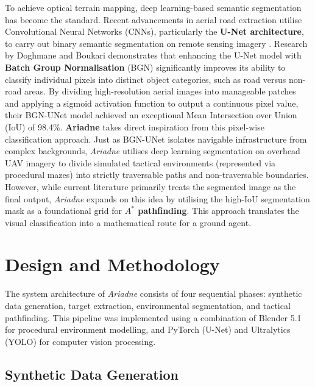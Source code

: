\documentclass[12pt, a4paper]{article}
\begin{document}
\vspace{0.5cm}

To achieve optical terrain mapping, deep learning-based semantic segmentation has become the standard. Recent advancements in aerial road extraction utilise Convolutional Neural Networks (CNNs), particularly the \textbf{U-Net architecture}, to carry out binary semantic segmentation on remote sensing imagery \cite{Doghmane_Boukari_2024}. Research by Doghmane and Boukari demonstrates that enhancing the U-Net model with \textbf{Batch Group Normalisation} (BGN) significantly improves its ability to classify individual pixels into distinct object categories, such as road versus non-road areas. By dividing high-resolution aerial images into manageable patches and applying a sigmoid activation function to output a continuous pixel value, their BGN-UNet model achieved an exceptional Mean Intersection over Union (IoU) of 98.4\%. \textbf{Ariadne} takes direct inspiration from this pixel-wise classification approach. Just as BGN-UNet isolates navigable infrastructure from complex backgrounds, \textit{Ariadne} utilises deep learning segmentation on overhead UAV imagery to divide simulated tactical environments (represented via procedural mazes) into strictly traversable paths and non-traversable boundaries. However, while current literature primarily treats the segmented image as the final output, \textit{Ariadne} expands on this idea by utilising the high-IoU segmentation mask as a foundational grid for \textbf{$A^*$ pathfinding}. This approach translates the visual classification into a mathematical route for a ground agent.

\newpage

\section{Design and Methodology}

The system architecture of \textit{Ariadne} consists of four sequential phases: synthetic data generation, target extraction, environmental segmentation, and tactical pathfinding. This pipeline was implemented using a combination of Blender 5.1 for procedural environment modelling, and PyTorch (U-Net) and Ultralytics (YOLO) for computer vision processing.

\vspace{0.5cm}

\subsection{Synthetic Data Generation}
\end{document}
